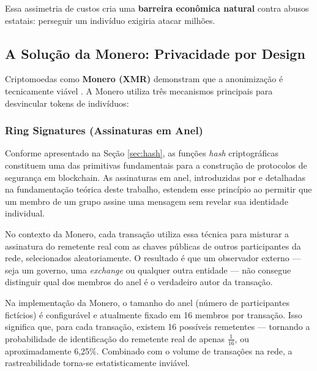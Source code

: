 Essa assimetria de custos cria uma \textbf{barreira econômica natural} contra abusos estatais: perseguir um indivíduo exigiria atacar milhões.

\subsection{A Solução da Monero: Privacidade por Design}

Criptomoedas como \textbf{Monero (XMR)} demonstram que a anonimização é tecnicamente viável \cite{monero2023}. A Monero utiliza três mecanismos principais para desvincular tokens de indivíduos:

\subsubsection{Ring Signatures (Assinaturas em Anel)}

Conforme apresentado na Seção \ref{sec:hash}, as funções \textit{hash} criptográficas constituem uma das primitivas fundamentais para a construção de protocolos de segurança em blockchain. As assinaturas em anel, introduzidas por  e detalhadas na fundamentação teórica deste trabalho, estendem esse princípio ao permitir que um membro de um grupo assine uma mensagem sem revelar sua identidade individual.

No contexto da Monero, cada transação utiliza essa técnica para misturar a assinatura do remetente real com as chaves públicas de outros participantes da rede, selecionados aleatoriamente. O resultado é que um observador externo --- seja um governo, uma \textit{exchange} ou qualquer outra entidade --- não consegue distinguir qual dos membros do anel é o verdadeiro autor da transação.

Na implementação da Monero, o tamanho do anel (número de participantes fictícios) é configurável e atualmente fixado em 16 membros por transação. Isso significa que, para cada transação, existem 16 possíveis remetentes --- tornando a probabilidade de identificação do remetente real de apenas $\frac{1}{16}$, ou aproximadamente 6,25\%. Combinado com o volume de transações na rede, a rastreabilidade torna-se estatisticamente inviável.

